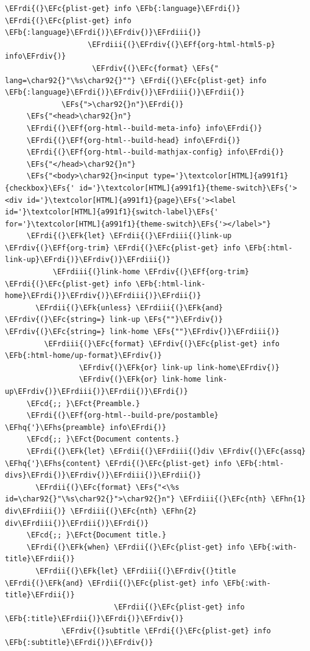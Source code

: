 \documentclass{scrartcl}
\newcommand{\EFk}[1]{\textcolor{EFk}{#1}} %
\newcommand{\EFs}[1]{\textcolor{EFs}{#1}} %
\newcommand{\EFb}[1]{\textcolor{EFb}{#1}} %
\newcommand{\EFct}[1]{\textcolor{EFct}{#1}} %
\newcommand{\EFc}[1]{\textcolor{EFc}{#1}} %
\newcommand{\EFf}[1]{\textcolor{EFf}{#1}} %
\newcommand{\EFcd}[1]{\textcolor{EFcd}{#1}} %
\newcommand{\EFhn}[1]{#1} %
\newcommand{\EFhq}[1]{#1} %
\newcommand{\EFhs}[1]{#1} %
\newcommand{\EFrdi}[1]{#1} %
\newcommand{\EFrdii}[1]{#1} %
\newcommand{\EFrdiii}[1]{#1} %
\newcommand{\EFrdiv}[1]{#1} %
\begin{document}
\begin{Code}
\begin{Verbatim}[]
                     \EFrdi{(}\EFc{plist-get} info \EFb{:language}\EFrdi{)} \EFrdi{(}\EFc{plist-get} info \EFb{:language}\EFrdi{)}\EFrdiv{)}\EFrdiii{)}
                   \EFrdiii{(}\EFrdiv{(}\EFf{org-html-html5-p} info\EFrdiv{)}
                    \EFrdiv{(}\EFc{format} \EFs{" lang=\char92{}"\%s\char92{}""} \EFrdi{(}\EFc{plist-get} info \EFb{:language}\EFrdi{)}\EFrdiv{)}\EFrdiii{)}\EFrdii{)}
             \EFs{">\char92{}n"}\EFrdi{)}
     \EFs{"<head>\char92{}n"}
     \EFrdi{(}\EFf{org-html--build-meta-info} info\EFrdi{)}
     \EFrdi{(}\EFf{org-html--build-head} info\EFrdi{)}
     \EFrdi{(}\EFf{org-html--build-mathjax-config} info\EFrdi{)}
     \EFs{"</head>\char92{}n"}
     \EFs{"<body>\char92{}n<input type='}\textcolor[HTML]{a991f1}{checkbox}\EFs{' id='}\textcolor[HTML]{a991f1}{theme-switch}\EFs{'><div id='}\textcolor[HTML]{a991f1}{page}\EFs{'><label id='}\textcolor[HTML]{a991f1}{switch-label}\EFs{' for='}\textcolor[HTML]{a991f1}{theme-switch}\EFs{'></label>"}
     \EFrdi{(}\EFk{let} \EFrdii{(}\EFrdiii{(}link-up \EFrdiv{(}\EFf{org-trim} \EFrdi{(}\EFc{plist-get} info \EFb{:html-link-up}\EFrdi{)}\EFrdiv{)}\EFrdiii{)}
           \EFrdiii{(}link-home \EFrdiv{(}\EFf{org-trim} \EFrdi{(}\EFc{plist-get} info \EFb{:html-link-home}\EFrdi{)}\EFrdiv{)}\EFrdiii{)}\EFrdii{)}
       \EFrdii{(}\EFk{unless} \EFrdiii{(}\EFk{and} \EFrdiv{(}\EFc{string=} link-up \EFs{""}\EFrdiv{)} \EFrdiv{(}\EFc{string=} link-home \EFs{""}\EFrdiv{)}\EFrdiii{)}
         \EFrdiii{(}\EFc{format} \EFrdiv{(}\EFc{plist-get} info \EFb{:html-home/up-format}\EFrdiv{)}
                 \EFrdiv{(}\EFk{or} link-up link-home\EFrdiv{)}
                 \EFrdiv{(}\EFk{or} link-home link-up\EFrdiv{)}\EFrdiii{)}\EFrdii{)}\EFrdi{)}
     \EFcd{;; }\EFct{Preamble.}
     \EFrdi{(}\EFf{org-html--build-pre/postamble} \EFhq{'}\EFhs{preamble} info\EFrdi{)}
     \EFcd{;; }\EFct{Document contents.}
     \EFrdi{(}\EFk{let} \EFrdii{(}\EFrdiii{(}div \EFrdiv{(}\EFc{assq} \EFhq{'}\EFhs{content} \EFrdi{(}\EFc{plist-get} info \EFb{:html-divs}\EFrdi{)}\EFrdiv{)}\EFrdiii{)}\EFrdii{)}
       \EFrdii{(}\EFc{format} \EFs{"<\%s id=\char92{}"\%s\char92{}">\char92{}n"} \EFrdiii{(}\EFc{nth} \EFhn{1} div\EFrdiii{)} \EFrdiii{(}\EFc{nth} \EFhn{2} div\EFrdiii{)}\EFrdii{)}\EFrdi{)}
     \EFcd{;; }\EFct{Document title.}
     \EFrdi{(}\EFk{when} \EFrdii{(}\EFc{plist-get} info \EFb{:with-title}\EFrdii{)}
       \EFrdii{(}\EFk{let} \EFrdiii{(}\EFrdiv{(}title \EFrdi{(}\EFk{and} \EFrdii{(}\EFc{plist-get} info \EFb{:with-title}\EFrdii{)}
                         \EFrdii{(}\EFc{plist-get} info \EFb{:title}\EFrdii{)}\EFrdi{)}\EFrdiv{)}
             \EFrdiv{(}subtitle \EFrdi{(}\EFc{plist-get} info \EFb{:subtitle}\EFrdi{)}\EFrdiv{)}

\end{Verbatim}
\end{Code}
\end{document}

